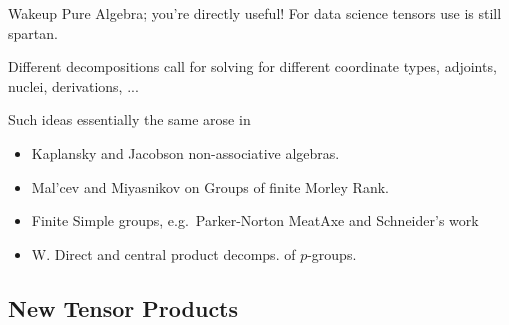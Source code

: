 \documentclass{beamer}
\DeclareMathOperator{\Span}{Span}
\DeclareMathOperator{\End}{End}
\begin{document}


\begin{frame}{Wakeup Pure Algebra; you're directly useful!}
    For data science tensors use is still spartan.

    Different decompositions call for solving for different coordinate types, 
    adjoints, nuclei, derivations, ... 
    
    Such ideas essentially the same arose in 
    \begin{itemize}
        \item Kaplansky and Jacobson non-associative algebras.
        \item Mal'cev and Miyasnikov on Groups of finite Morley Rank.
        \item Finite Simple groups, e.g.\ Parker-Norton MeatAxe and Schneider's work
        \item W. Direct and central product decomps. of $p$-groups.
    \end{itemize}

\end{frame}

\subsection{New Tensor Products}
\end{document}
